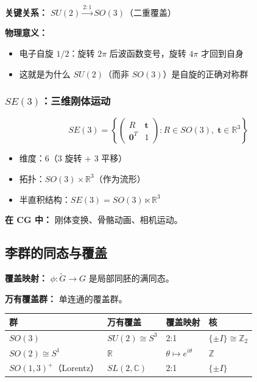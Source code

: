 \textbf{关键关系：} $SU(2) \xrightarrow{2:1} SO(3)$（二重覆盖）

\textbf{物理意义：}
\begin{itemize}
  \item 电子自旋 $1/2$：旋转 $2\pi$ 后波函数变号，旋转 $4\pi$ 才回到自身
  \item 这就是为什么 $SU(2)$（而非 $SO(3)$）是自旋的正确对称群
\end{itemize}

\subsubsection{$SE(3)$：三维刚体运动}

\[
SE(3) = \left\{\begin{pmatrix} R & \mathbf{t} \\ \mathbf{0}^T & 1 \end{pmatrix} : R \in SO(3),\; \mathbf{t} \in \mathbb{R}^3\right\}
\]

\begin{itemize}
  \item 维度：6（3 旋转 + 3 平移）
  \item 拓扑：$SO(3) \times \mathbb{R}^3$（作为流形）
  \item 半直积结构：$SE(3) = SO(3) \ltimes \mathbb{R}^3$
\end{itemize}

\textbf{在 CG 中：} 刚体变换、骨骼动画、相机运动。

\subsection{李群的同态与覆盖}

\textbf{覆盖映射：} $\phi: \tilde{G} \to G$ 是局部同胚的满同态。

\textbf{万有覆盖群：} 单连通的覆盖群。

\begin{center}
\begin{tabular}{L{3cm}L{3cm}L{3cm}L{4cm}}
\toprule
\textbf{群} & \textbf{万有覆盖} & \textbf{覆盖映射} & \textbf{核} \\
\midrule
$SO(3)$ & $SU(2) \cong S^3$ & 2:1 & $\{\pm I\} \cong \mathbb{Z}_2$ \\
$SO(2) \cong S^1$ & $\mathbb{R}$ & $\theta \mapsto e^{i\theta}$ & $\mathbb{Z}$ \\
$SO(1,3)^+$（Lorentz） & $SL(2,\mathbb{C})$ & 2:1 & $\{\pm I\}$ \\
\bottomrule
\end{tabular}
\end{center}

